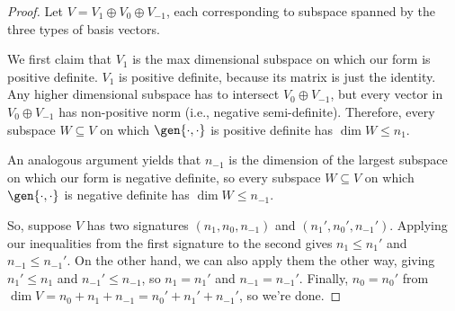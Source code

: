\begin{proof}
Let $V = V_1\oplus V_0\oplus V_{-1}$, each corresponding to subspace spanned by the three types of basis vectors. 

We first claim that $V_1$ is the max dimensional subspace on which our form is positive definite. $V_1$ is positive definite, because its matrix is just the identity. Any higher dimensional subspace has to intersect $V_0\oplus V_{-1}$, but every vector in $V_0\oplus V_{-1}$ has non-positive norm (i.e., negative semi-definite). Therefore, every subspace $W\subseteq V$ on which $\gen{\cdot, \cdot}$ is positive definite has $\dim W\leq n_1$. 

An analogous argument yields that $n_{-1}$ is the dimension of the largest subspace on which our form is negative definite, so every subspace $W\subseteq V$ on which $\gen{\cdot, \cdot}$ is negative definite has $\dim W \leq n_{-1}$.

So, suppose $V$ has two signatures $(n_1, n_0, n_{-1})$ and $(n_1', n_0', n_{-1}')$. Applying our inequalities from the first signature to the second gives $n_1\leq n_1'$ and $n_{-1}\leq n_{-1}'$. On the other hand, we can also apply them the other way, giving $n_1'\leq n_1$ and $n_{-1}'\leq n_{-1}$, so $n_1=n_1'$ and $n_{-1} = n_{-1}'$. Finally, $n_0=n_0'$ from $\dim V = n_0 + n_1 + n_{-1} = n_0' + n_1' + n_{-1}'$, so we're done. 
\end{proof}